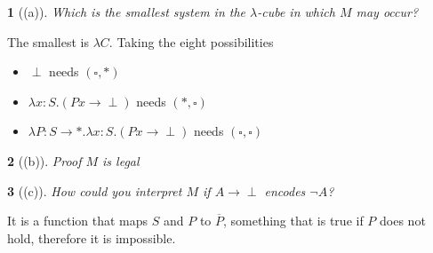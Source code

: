 \documentclass[12pt, a4paper]{article}
\newtheorem*{exercise}{}
\begin{document}
\begin{exercise}[(a)]
    Which is the smallest system in the $\lambda$-cube in which $M$ may occur?
\end{exercise}
The smallest is $\lambda C$. Taking the eight possibilities
\begin{itemize}
    \item $\perp$ needs $(\square, *)$
    \item $\lambda x : S. (P x \to \perp)$ needs $(*, \square)$
    \item $\lambda P : S \to *. \lambda x : S. (P x \to \perp)$ needs $(\square, \square)$
\end{itemize}

\begin{exercise}[(b)]
    Proof $M$ is legal
\end{exercise}
\begin{flagderiv}
    \step{}{\perp : *}{}
\end{flagderiv}

\begin{exercise}[(c)]
    How could you interpret $M$ if $A \to \perp$ encodes $\neg A$?
\end{exercise}
It is a function that maps $S$ and $P$ to $\overline{P}$, something that is true if $P$ does not hold, therefore it is impossible.

\newpage


\end{document}
